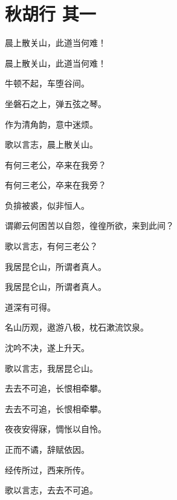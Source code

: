 \documentclass[12pt,a4paper]{ctexbook}
\begin{document}
\section{秋胡行 其一}
晨上散关山，此道当何难！\par
晨上散关山，此道当何难！\par
牛顿不起，车堕谷间。\par
坐磐石之上，弹五弦之琴。\par
作为清角韵，意中迷烦。\par
歌以言志，晨上散关山。\par
有何三老公，卒来在我旁？\par
有何三老公，卒来在我旁？\par
负揜被裘，似非恒人。\par
谓卿云何困苦以自怨，徨徨所欲，来到此间？\par
歌以言志，有何三老公？\par
我居昆仑山，所谓者真人。\par
我居昆仑山，所谓者真人。\par
道深有可得。\par
名山历观，遨游八极，枕石漱流饮泉。\par
沈吟不决，遂上升天。\par
歌以言志，我居昆仑山。\par
去去不可追，长恨相牵攀。\par
去去不可追，长恨相牵攀。\par
夜夜安得寐，惆怅以自怜。\par
正而不谲，辞赋依因。\par
经传所过，西来所传。\par
歌以言志，去去不可追。\par
\end{document}
